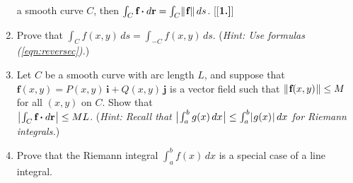 \begin{enumerate}[\bfseries 1.]
  a smooth curve $C$, then $\int_C \textbf{f} \bm{\cdot} d\textbf{r} = \int_C \lVert\mspace{1mu}\textbf{f}\mspace{1mu}\rVert\,ds$.
[{[\bfseries 1.]}]
 \item Prove that $\int_C f(x,y)\,ds = \int_{-C} f(x,y)\,ds$. (\emph{Hint: Use formulas (\ref{eqn:reversec}).})
 \item Let $C$ be a smooth curve with arc length $L$, and suppose that $\textbf{f}(x,y) = P(x,y)\,\textbf{i} +
  Q(x,y)\,\textbf{j}$ is a vector field such that $\lVert\mspace{1mu}\textbf{f}(x,y)\mspace{1mu}\rVert \le M$ for all $(x,y)$ on $C$. Show
  that\\$\bigl\lvert\mspace{1mu}\int_C \textbf{f} \bm{\cdot} d\textbf{r}\mspace{1mu}\bigr\rvert \le ML$.
  (\emph{Hint: Recall that $\bigl\lvert\mspace{1mu}\int_a^b g(x)\,dx\mspace{1mu}\bigr\rvert \le \int_a^b \lvert\mspace{1mu}g(x)\mspace{1mu}\rvert\,dx$ for Riemann integrals.})
 \item Prove that the Riemann integral $\int_a^b f(x)\,dx$ is a special case of a line integral.
\end{enumerate}
\newpage
